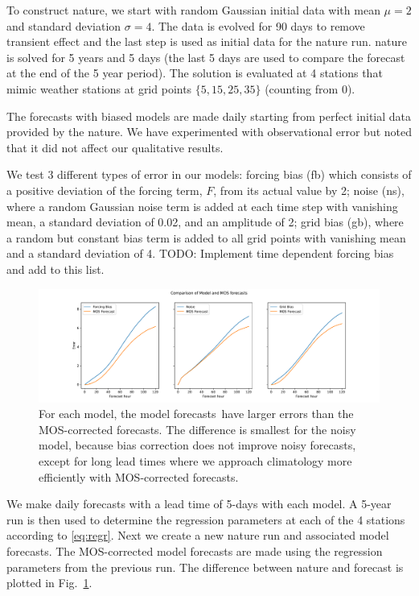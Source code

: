 \documentclass[10pt]{article}
\newcommand{\todo}[1]{{\color{red} TODO: {#1}}}
\begin{document}
To construct nature, we start with random Gaussian initial data with mean $\mu=2$ and standard deviation $\sigma= 4$. The data is evolved for 90 days to remove transient effect and the last step is used as initial data for the nature run. nature is solved for 5 years and 5 days (the last 5 days are used to compare the forecast at the end of the 5 year period). The solution is evaluated at 4 stations that mimic weather stations at grid points $\{5, 15, 25, 35 \}$ (counting from 0). 

The forecasts with biased models are made daily starting from perfect initial data provided by the nature. We have experimented with observational error but noted that it did not affect our qualitative results.  

We test 3 different types of error in our models: forcing bias (fb) which consists of a positive deviation of the forcing term, $F$, from its actual value by 2; noise (ns), where a random Gaussian noise term is added at each time step with vanishing mean, a standard deviation of 0.02, and an amplitude of 2; grid bias (gb), where a random but constant bias term is added to all grid points with vanishing mean and a standard deviation of 4.  \todo{Implement time dependent forcing bias and add to this list.}

\begin{figure}[ht]
	\center
	\includegraphics[width=\columnwidth]{figs/ModelMOS}
	\caption{For each model, the model forecasts have larger errors than the MOS-corrected forecasts. The difference is smallest for the noisy model, because bias correction does not improve noisy forecasts, except for long lead times where we approach climatology more efficiently with MOS-corrected forecasts.}
	\label{fig:MOS}
\end{figure}

We make daily forecasts with a lead time of 5-days with each model. A 5-year run is then used to determine the regression parameters at each of the 4 stations according to \eqref{eq:regr}. Next we create a new nature run and associated model forecasts. The MOS-corrected model forecasts are made using the regression parameters from the previous run. The difference between nature and forecast is plotted in Fig.~\ref{fig:MOS}. 
\end{document}

